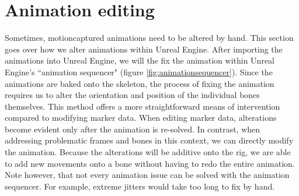 \documentclass{uva-inf-article}
\begin{document}
\section{Animation editing}
Sometimes, motioncaptured animations need to be altered by hand. This section goes over how we alter animations within Unreal Engine. After importing the animations into Unreal Engine, we will the fix the animation within Unreal Engine's ``animation sequencer" (figure \ref{fig:animationsequencer}). Since the animations are baked onto the skeleton, the process of fixing the animation requires us to alter the orientation and position of the individual bones themselves. This method offers a more straightforward means of intervention compared to modifying marker data. When editing marker data, alterations become evident only after the animation is re-solved. In contrast, when addressing problematic frames and bones in this context, we can directly modify the animation. Because the alterations will be additive onto the rig, we are able to add new movements onto a bone without having to redo the entire animation. Note however, that not every animation issue can be solved with the animation sequencer. For example, extreme jitters would take too long to fix by hand.
\end{document}
